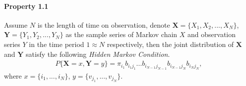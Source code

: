 \documentclass[runningheads]{llncs}
\begin{document}
\paragraph{Property 1.1}
Assume $N$ is the length of time on observation,
denote $\mathbf{X}= \{ X_1, X_2,..., X_N \} $, $\mathbf{Y} = \{ Y_1, Y_2,..., Y_N \} $
as the sample series of Markov chain $X$ and observation series $Y$ in the time period $1\approx N$
respectively, then the joint distribution of $\mathbf{X}$ and $\mathbf{Y}$ satisfy
the following \emph{Hidden Markov Condition}.
\begin{align}
    P\{ \mathbf{X} = x, \mathbf{Y} = y \} = \pi_{i_1} b_{i_1 j_1}... b_{i_{N-1} j_{N-1}} b_{i_{N-1} j_{N}} b_{i_{N} j_{N}},
\end{align}
where $x = \{ i_1, ..., i_N \} $, $y = \{ v_{j_1}, ..., v_{j_N} \} $.
\end{document}
